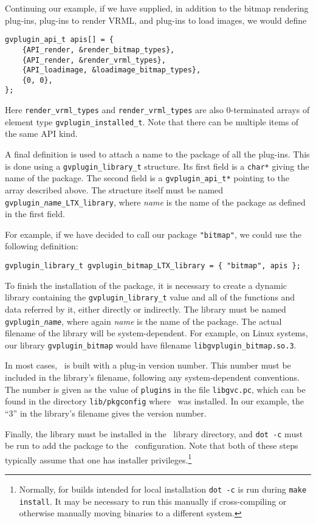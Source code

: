 Continuing our example, if we have supplied, in addition
to the bitmap rendering plug-ins, plug-ins to render VRML, and
plug-ins to load images, we would define
\begin{verbatim}
gvplugin_api_t apis[] = {
    {API_render, &render_bitmap_types},
    {API_render, &render_vrml_types},
    {API_loadimage, &loadimage_bitmap_types},
    {0, 0},
};
\end{verbatim}
Here {\tt render\_vrml\_types} and  {\tt render\_vrml\_types}
are also 0-terminated arrays of element type {\tt gvplugin\_installed\_t}.
Note that there can be multiple items of the same API kind.

A final definition is used to attach a name to the package of
all the plug-ins. This is done using a {\tt gvplugin\_library\_t}
structure. Its first field is a {\tt char*} giving the name of the
package. The second field is a {\tt gvplugin\_api\_t*} pointing to
the array described above. The structure itself must be named
{\tt gvplugin\_{\em name}\_LTX\_library}, where {\em name} is the
name of the package as defined in the first field. 

For example, if we have decided to call our package {\tt "bitmap"},
we could use the following definition:
\begin{verbatim}
gvplugin_library_t gvplugin_bitmap_LTX_library = { "bitmap", apis };
\end{verbatim}

To finish the installation of the package, it is necessary to create
a dynamic library containing the {\tt gvplugin\_library\_t} value and
all of the functions and data referred by it, either directly or
indirectly. The library must be named {\tt gvplugin\_{\em name}},
where again {\em name} is the name of the package. The actual filename
of the library will be system-dependent. For example, on Linux systems,
our library {\tt gvplugin\_bitmap} would have filename 
{\tt libgvplugin\_bitmap.so.3}. 

In most cases, \gviz\ is built with
a plug-in version number. This number must be included in the library's
filename, following any system-dependent conventions. 
The number is given as the value of {\tt plugins} in the file
{\tt libgvc.pc}, which can be found in the directory {\tt lib/pkgconfig}
where \gviz\ was installed.
In our example, the ``3'' in the library's filename gives the version number. 

Finally, the library must be installed in the \gviz\ library directory,
and {\tt dot -c} must be run to add the package to the \gviz\ configuration.
Note that both of these steps typically assume that one has installer
privileges.\footnote{
Normally, for builds intended for local installation {\tt dot -c} is run 
during {\tt make install}.
It may be necessary to run this manually if cross-compiling or otherwise 
manually moving binaries to a different system. 
}

